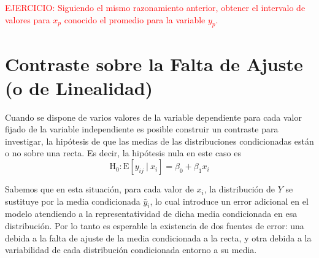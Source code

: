 \documentclass[10pt,a4paper]{book}
\begin{document}
\textcolor{red}{EJERCICIO: Siguiendo el mismo razonamiento anterior, obtener el intervalo de valores para $x_p$ conocido el promedio para la variable $y_p$.}
	\section{Contraste sobre la Falta de Ajuste (o de Linealidad)}
Cuando se dispone de varios valores de la variable dependiente para cada valor fijado de la variable independiente es posible construir un contraste para investigar, la hipótesis de que las medias de las distribuciones condicionadas están o no sobre una recta. Es decir, la hipótesis nula en este caso es
$$\mathrm{H}_0:\mathrm{E}[y_{ij}\ |\ x_i]=\beta_0+\beta_1x_i$$

Sabemos que en esta situación, para cada valor de $x_i$, la distribución de $Y$ se sustituye por la media condicionada $\bar{y}_i$, lo cual introduce un error adicional en el modelo atendiendo a la representatividad de dicha media condicionada en esa distribución. Por lo tanto es esperable la existencia de dos fuentes de error: una debida a la falta de ajuste de la media condicionada a la recta, y otra debida a la variabilidad de cada distribución condicionada entorno a su media.
\end{document}

